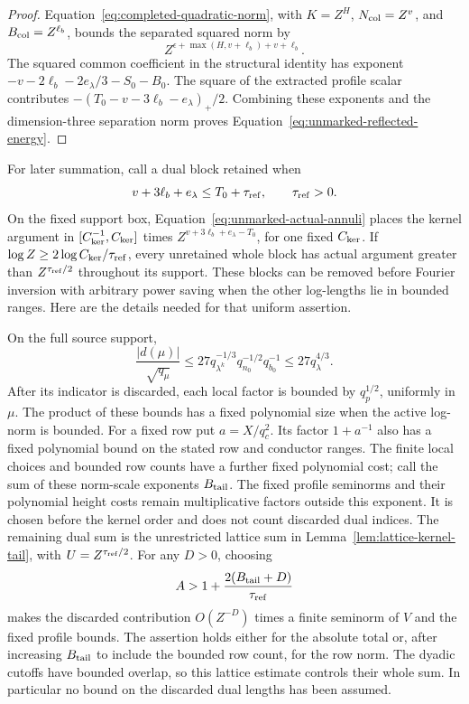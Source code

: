 \documentclass[11pt,a4paper]{article}
\numberwithin{equation}{section}
\numberwithin{figure}{section}
\theoremstyle{definition}
\theoremstyle{remark}
\begin{document}
\begin{proof}
Equation~\eqref{eq:completed-quadratic-norm}, with
$K=Z^H$, $N_{\rm col}=Z^v$, and $B_{\rm col}=Z^{\ell_b}$, bounds the
separated squared norm by
\[
 Z^{\epsilon+\max(H,v+\ell_b)+v+\ell_b}.
\]
The squared common coefficient in the structural identity has exponent
$-v-2\ell_b-2e_\lambda/3-S_0-B_0$.  The square of the extracted profile
scalar contributes $-(T_0-v-3\ell_b-e_\lambda)_+/2$.  Combining these
exponents and the dimension-three separation norm proves
Equation~\eqref{eq:unmarked-reflected-energy}.
\end{proof}

For later summation, call a dual block retained when
\[
 v+3\ell_b+e_\lambda\le T_0+\tau_{\rm ref},
 \qquad \tau_{\rm ref}>0.
\]
On the fixed support box, Equation~\eqref{eq:unmarked-actual-annuli} places
the kernel argument in $[C_{\rm ker}^{-1},C_{\rm ker}]$ times
$Z^{v+3\ell_b+e_\lambda-T_0}$, for one fixed $C_{\rm ker}$.  If
$\log Z\ge2\log C_{\rm ker}/\tau_{\rm ref}$, every unretained whole
block has actual argument greater than $Z^{\tau_{\rm ref}/2}$ throughout
its support.  These blocks can be removed before Fourier inversion with
arbitrary power saving when the other log-lengths lie in bounded ranges.
Here are the details needed for that uniform assertion.

On the full source support,
\[
 \frac{|d(\mu)|}{\sqrt{q_\mu}}
 \le27q_{\lambda^k}^{-1/3}q_{n_0}^{-1/2}q_{b_0}^{-1}
 \le27q_\lambda^{4/3}.
\]
After its indicator is discarded, each local factor is bounded by
$q_p^{1/2}$, uniformly in $\mu$.  The product of these bounds has a fixed
polynomial size when the active log-norm is bounded.  For a fixed row put
$a=X/q_c^2$.  Its factor $1+a^{-1}$ also has a fixed polynomial bound on
the stated row and conductor ranges.  The finite local choices and bounded
row counts have a further fixed polynomial cost; call the sum of these
norm-scale exponents $B_{\rm tail}$.  The fixed profile seminorms and their
polynomial height costs remain multiplicative factors outside this exponent.
It is chosen before the kernel order and does not count discarded dual indices.
The remaining dual sum is the unrestricted lattice sum in
Lemma~\ref{lem:lattice-kernel-tail}, with $U=Z^{\tau_{\rm ref}/2}$.
For any $D>0$, choosing
\[
 A>1+\frac{2(B_{\rm tail}+D)}{\tau_{\rm ref}}
\]
makes the discarded contribution $O(Z^{-D})$ times a finite seminorm of
$V$ and the fixed profile bounds.  The assertion holds either for the
absolute total or, after increasing $B_{\rm tail}$ to include the bounded
row count, for the row norm.  The dyadic cutoffs have bounded overlap, so
this lattice estimate controls their whole sum.  In particular no bound on
the discarded dual lengths has been assumed.
\end{document}
